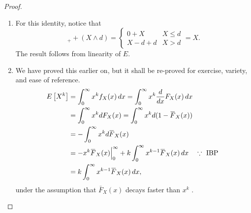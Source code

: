 \documentclass[notoc,notitlepage]{tufte-book}
\begin{document}
\begin{proof}
  \begin{enumerate}
    \item For this identity, notice that
      \begin{equation*}
        [ X - d ]_+ + ( X \land d ) = \begin{cases}
          0 + X     & X \leq d \\
          X - d + d & X > d
        \end{cases} = X.
      \end{equation*}
      The result follows from linearity of $E$.

    \item We have proved this earlier on, but it shall be re-proved for exercise, variety, and ease of reference.
      \begin{align*}
        E \left[ X^k \right] &= \int_{0}^{\infty} x^k f_X(x) \dif{x} = \int_{0}^{\infty} x^k \frac{d}{dx} F_X(x) \dif{x} \\
                             &= \int_{0}^{\infty} x^k d F_X(x) = \int_{0}^{\infty} x^k d( 1 - \bar{F}_X(x) ) \\
                             &= - \int_{0}^{\infty} x^k d \bar{F}_X(x) \\
                             &= - x^k \bar{F}_X(x) \at{0}{\infty} + k \int_{0}^{\infty} x^{k - 1} \bar{F}_X(x) \dif{x} \quad \because \text{ IBP } \\
                             &= k \int_{0}^{\infty} x^{k - 1} \bar{F}_X(x) \dif{x},
      \end{align*}
      under the assumption that $\bar{F}_X(x)$ decays faster than $x^k$ .


\end{enumerate}
\end{proof}
\end{document}
